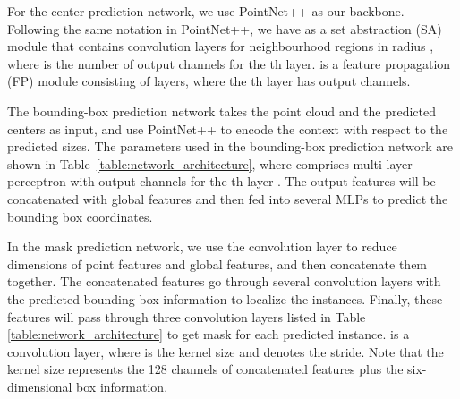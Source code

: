 \documentclass[runningheads]{llncs}
\begin{document}
For the center prediction network, we use PointNet++ as our backbone. Following the same notation in PointNet++, we have  as a set abstraction (SA) module that contains   convolution layers for  neighbourhood regions in radius , where   is the number of output channels for the th layer.  is a feature propagation (FP) module consisting of   layers, where the th layer has  output channels.


The bounding-box prediction network takes the point cloud and the predicted centers as input, and use PointNet++ to encode the context with respect to the predicted sizes. The parameters used in the bounding-box prediction network are shown in Table~\ref{table:network_architecture}, where  comprises multi-layer perceptron with  output channels for the th layer . The output features will be  concatenated with global features and then fed into several MLPs to predict the bounding box coordinates.

In the mask prediction network, we use the convolution layer to reduce dimensions of point features and global features, and then concatenate them together. The concatenated features go through several convolution layers with the predicted bounding box information to localize the instances. Finally, these features will pass through three convolution layers listed in Table \ref{table:network_architecture} to get  mask for each predicted instance.  is a convolution layer, where  is the kernel size and  denotes the stride. Note that the kernel size  
represents the 128 channels of concatenated features plus the six-dimensional box information.






\end{document}
